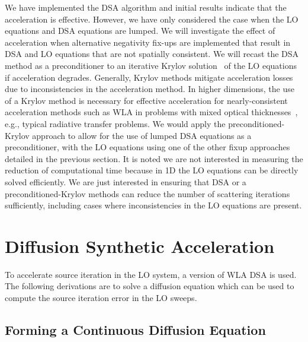 We have implemented the DSA algorithm and initial results indicate that the
acceleration is effective.  However, we have only considered the case when
the LO equations and DSA equations are lumped.  We will investigate the effect of acceleration when alternative negativity fix-ups are
implemented that result in DSA and LO equations that are not spatially consistent.
We will recast the DSA method as a preconditioner to an iterative
Krylov solution~\cite{larson_morel_sn} of the LO equations if acceleration degrades.  Generally, Krylov
methods mitigate acceleration losses due to inconsistencies in the acceleration
method.  In higher dimensions, the use of a Krylov method is necessary for effective
acceleration for nearly-consistent acceleration methods such as WLA in problems with
mixed optical thicknesses~\cite{larson_morel_sn}, e.g., typical radiative transfer
problems.
  We would apply the preconditioned-Krylov approach to allow for the use of lumped DSA
  equations as a preconditioner, with the LO equations using one of the other fixup
approaches detailed
in the previous section.  It is noted we are not interested in measuring the reduction of
computational time because in 1D the LO equations can be directly solved efficiently.
We are just interested in ensuring that DSA or a preconditioned-Krylov methods can reduce the
number of scattering iterations sufficiently, including cases where inconsistencies
in the LO equations are present.  %

\section{Diffusion Synthetic Acceleration}

To accelerate source iteration in the LO system, a version of WLA DSA is used.  The
following derivations are to solve a diffusion equation which can be used to compute
the source iteration error in the LO sweeps.

\subsection{Forming a Continuous Diffusion Equation}

